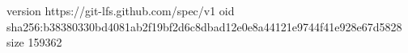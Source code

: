 version https://git-lfs.github.com/spec/v1
oid sha256:b38380330bd4081ab2f19bf2d6c8dbad12e0e8a44121e9744f41e928e67d5828
size 159362
